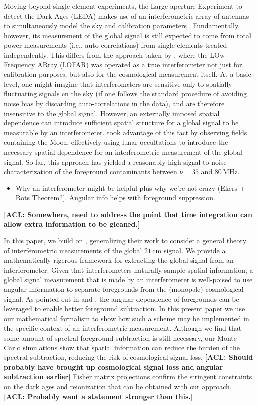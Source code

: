 \documentclass[twolcolumn,apj,iop,numberedappendix]{emulateapj}
\newcommand{\acl}[1]{{\color{red} \textbf{[ACL:  #1]}}}
\begin{document}
Moving beyond single element experiments, the Large-aperture Experiment to detect the Dark Ages (LEDA) makes use of an interferometric array of antennas to simultaneously model the sky and calibration parameters \citep{BernardiLEDA}.  Fundamentally, however, its measurement of the global signal is still expected to come from total power measurements (i.e., auto-correlations) from single elements treated independently.  This differs from the approach taken by \citet{VedanthamLOFAR2}, where the LOw Frequency ARray (LOFAR) was operated as a true interferometer not just for calibration purposes, but also for the cosmological measurement itself.  At a basic level, one might imagine that interferometers are sensitive only to spatially fluctuating signals on the sky (if one follows the standard procedure of avoiding noise bias by discarding auto-correlations in the data), and are therefore insensitive to the global signal.  However, an externally imposed spatial dependence can introduce sufficient spatial structure for a global signal to be measurable by an interferometer.  \citet{VedanthamLOFAR2} took advantage of this fact by observing fields containing the Moon, effectively using lunar occultations to introduce the necessary spatial dependence for an interferometric measurement of the global signal.  So far, this approach has yielded a reasonably high signal-to-noise characterization of the foreground contaminants between $\nu =35$ and $80\,\textrm{MHz}$.

\begin{itemize}
\item Why an interferometer might be helpful plus why we're not crazy (Ekers + Rots Theorem?).  Angular info helps with foreground suppression.
\end{itemize}
\acl{Somewhere, need to address the point that time integration can allow extra information to be gleaned.}

In this paper, we build on \citet{VedanthamLOFAR2}, generalizing their work to consider a general theory of interferometric measurements of the global $21\,\textrm{cm}$ signal.  We provide a mathematically rigorous framework for extracting the global signal from an interferometer.  Given that interferometers naturally sample spatial information, a global signal measurement that is made by an interferometer is well-poised to use angular information to separate foregrounds from the (monopole) cosmological signal.  As pointed out in \citep{L13} and \citep{Liu_Switzer_2014}, the angular dependence of foregrounds can be leveraged to enable better foreground subtraction.  In this present paper we use our mathematical formalism to show how such a scheme may be implemented in the specific context of an interferometric measurement.  Although we find that some amount of spectral foreground subtraction is still necessary, our Monte Carlo simulations show that spatial information can reduce the burden of the spectral subtraction, reducing the risk of cosmological signal loss.  \acl{Should probably have brought up cosmological signal loss and angular subtraction earlier}  Fisher matrix projections confirm the stringent constraints on the dark ages and reionization that can be obtained with our approach.  \acl{Probably want a statement stronger than this.}
\end{document}
